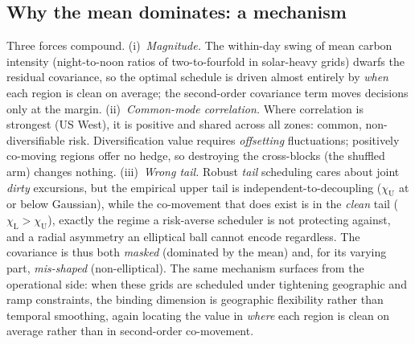 \documentclass[12pt]{article}
\newcommand{\chiU}{\chi_{\mathrm{U}}}
\newcommand{\chiL}{\chi_{\mathrm{L}}}
\begin{document}
\subsection{Why the mean dominates: a mechanism}\label{sec:res-mech}
Three forces compound. (i)~\emph{Magnitude.} The within-day swing of mean carbon
intensity (night-to-noon ratios of two-to-fourfold in solar-heavy grids) dwarfs
the residual covariance, so the optimal schedule is driven almost entirely by
\emph{when} each region is clean on average; the second-order covariance term
moves decisions only at the margin. (ii)~\emph{Common-mode correlation.} Where
correlation is strongest (US West), it is positive and shared across all zones:
common, non-diversifiable risk. Diversification value requires \emph{offsetting}
fluctuations; positively co-moving regions offer no hedge, so destroying the
cross-blocks (the shuffled arm) changes nothing. (iii)~\emph{Wrong tail.} Robust
\emph{tail} scheduling cares about joint \emph{dirty} excursions, but the empirical
upper tail is independent-to-decoupling ($\chiU$ at or below Gaussian), while the
co-movement that does exist is in the \emph{clean} tail ($\chiL>\chiU$), exactly
the regime a risk-averse scheduler is not protecting against, and a radial
asymmetry an elliptical ball cannot encode regardless. The covariance is thus both
\emph{masked} (dominated by the mean) and, for its varying part, \emph{mis-shaped}
(non-elliptical). The same mechanism surfaces from the operational side: when these
grids are scheduled under tightening geographic and ramp constraints, the binding
dimension is geographic flexibility rather than temporal smoothing, again locating
the value in \emph{where} each region is clean on average rather than in second-order
co-movement.
\end{document}
